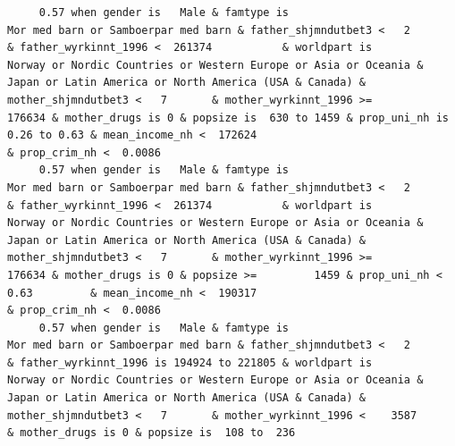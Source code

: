 \documentclass[
  letterpaper,
  DIV=11,
  numbers=noendperiod]{scrreprt}
\begin{document}
\begin{verbatim}
     0.57 when gender is   Male & famtype is                              Mor med barn or Samboerpar med barn & father_shjmndutbet3 <   2       & father_wyrkinnt_1996 <  261374           & worldpart is            Norway or Nordic Countries or Western Europe or Asia or Oceania & Japan or Latin America or North America (USA & Canada) & mother_shjmndutbet3 <   7       & mother_wyrkinnt_1996 >=           176634 & mother_drugs is 0 & popsize is  630 to 1459 & prop_uni_nh is 0.26 to 0.63 & mean_income_nh <  172624                                        & prop_crim_nh <  0.0086                                                                                                                                                                                                                                                                                      
     0.57 when gender is   Male & famtype is                              Mor med barn or Samboerpar med barn & father_shjmndutbet3 <   2       & father_wyrkinnt_1996 <  261374           & worldpart is            Norway or Nordic Countries or Western Europe or Asia or Oceania & Japan or Latin America or North America (USA & Canada) & mother_shjmndutbet3 <   7       & mother_wyrkinnt_1996 >=           176634 & mother_drugs is 0 & popsize >=         1459 & prop_uni_nh <  0.63         & mean_income_nh <  190317                                        & prop_crim_nh <  0.0086                                                                                                                                                                                                                                                                                      
     0.57 when gender is   Male & famtype is                              Mor med barn or Samboerpar med barn & father_shjmndutbet3 <   2       & father_wyrkinnt_1996 is 194924 to 221805 & worldpart is            Norway or Nordic Countries or Western Europe or Asia or Oceania & Japan or Latin America or North America (USA & Canada) & mother_shjmndutbet3 <   7       & mother_wyrkinnt_1996 <    3587           & mother_drugs is 0 & popsize is  108 to  236                                                                                                                                                                                                                                                                                                                                                                                                               

\end{verbatim}
\end{document}
